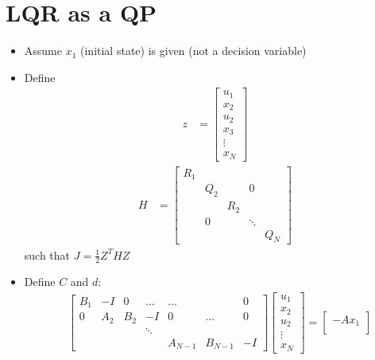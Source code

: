 \documentclass[11pt]{article}
\begin{document}
\section{LQR as a QP}
\begin{itemize}
    \item Assume $x_1$ (initial state) is given (not a decision variable)
    \item Define 
    \begin{align*}
        z &= 
        \begin{bmatrix}
            u_1 \\
            x_2 \\
            u_2 \\
            x_3 \\
            \vdots \\
            x_N
        \end{bmatrix}
    \end{align*}
    \begin{align*}
        H &= 
        \begin{bmatrix}
            R_1  & & & & \\
            & Q_2 & & 0&  \\
            & & R_2 & & \\
            & 0& & \ddots & \\
            & & & & Q_N
        \end{bmatrix}
    \end{align*}
    such that $J = \frac{1}{2}Z^THZ$
    \item Define $C$ and $d$:
    \begin{align*}
        &\begin{bmatrix}
            B_1 & -I & 0 & \dots & \dots & & 0 \\
            0 & A_2 & B_2 & -I & 0 & \dots & 0 \\  
            & & & \ddots & & & \\
            & & & & A_{N-1} & B_{N-1} & -I
        \end{bmatrix}
        \begin{bmatrix}
            u_1 \\
            x_2 \\
            u_2 \\
            \vdots \\
            x_N
        \end{bmatrix}
        =
        \begin{bmatrix}
            -Ax_1 \\

\end{bmatrix}
\end{align*}
\end{itemize}
\end{document}
